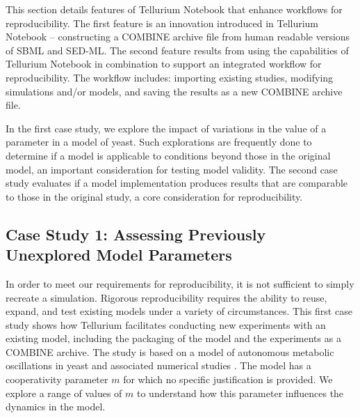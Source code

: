 \documentclass[10pt,letterpaper]{article}
\begin{document}
This section details features of Tellurium Notebook that enhance workflows for reproducibility. The first feature is an innovation introduced in Tellurium Notebook -- constructing a COMBINE archive file from human readable versions of SBML and SED-ML. The second feature results from using the capabilities of Tellurium Notebook in combination to support an integrated workflow for reproducibility. The workflow includes: importing existing studies, modifying simulations and/or models, and saving the results as a new COMBINE archive file.

In the first case study, we explore the impact of variations in the value of a parameter in a model of yeast. Such explorations are frequently done to determine if a model is applicable to conditions beyond those in the original model, an important consideration for testing model validity. The second case study evaluates if a model implementation produces results that are comparable to those in the original study, a core consideration for reproducibility.

\subsection*{Case Study 1: Assessing Previously Unexplored Model Parameters}

In order to meet our requirements for reproducibility, it is not sufficient to simply recreate a simulation. Rigorous reproducibility requires the ability to reuse, expand, and test existing models under a variety of circumstances. This first case study shows how Tellurium facilitates conducting new experiments with an existing model, including the packaging of the model and the experiments as a COMBINE archive. The study is based on a model of autonomous metabolic oscillations in yeast and associated numerical studies \cite{wolf2001mathematical}. The model has a cooperativity parameter $m$ for which no specific justification is provided. We explore a range of values of $m$ to understand how this parameter influences the dynamics in the model.
\end{document}
